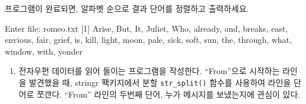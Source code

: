 \documentclass[
  letterpaper,
]{book}
\newenvironment{Shaded}{\begin{snugshade}}{\end{snugshade}}
\newcommand{\DecValTok}[1]{\textcolor[rgb]{0.68,0.00,0.00}{#1}}
\newcommand{\NormalTok}[1]{\textcolor[rgb]{0.00,0.23,0.31}{#1}}
\newcommand{\SpecialCharTok}[1]{\textcolor[rgb]{0.37,0.37,0.37}{#1}}
\newcommand{\StringTok}[1]{\textcolor[rgb]{0.13,0.47,0.30}{#1}}
\providecommand{\tightlist}{%
  \setlength{\itemsep}{0pt}\setlength{\parskip}{0pt}}\usepackage{longtable,booktabs,array}
\begin{document}
프로그램이 완료되면, 알파벳 순으로 결과 단어를 정렬하고 출력하세요.

\begin{Shaded}
\begin{Highlighting}[]
\NormalTok{Enter file}\SpecialCharTok{:}\NormalTok{ romeo.txt}
\NormalTok{[}\DecValTok{1}\NormalTok{] }\StringTok{\textquotesingle{}Arise\textquotesingle{}}\NormalTok{, }\StringTok{\textquotesingle{}But\textquotesingle{}}\NormalTok{, }\StringTok{\textquotesingle{}It\textquotesingle{}}\NormalTok{, }\StringTok{\textquotesingle{}Juliet\textquotesingle{}}\NormalTok{, }\StringTok{\textquotesingle{}Who\textquotesingle{}}\NormalTok{, }\StringTok{\textquotesingle{}already\textquotesingle{}}\NormalTok{,}
\StringTok{\textquotesingle{}and\textquotesingle{}}\NormalTok{, }\StringTok{\textquotesingle{}breaks\textquotesingle{}}\NormalTok{, }\StringTok{\textquotesingle{}east\textquotesingle{}}\NormalTok{, }\StringTok{\textquotesingle{}envious\textquotesingle{}}\NormalTok{, }\StringTok{\textquotesingle{}fair\textquotesingle{}}\NormalTok{, }\StringTok{\textquotesingle{}grief\textquotesingle{}}\NormalTok{,}
\StringTok{\textquotesingle{}is\textquotesingle{}}\NormalTok{, }\StringTok{\textquotesingle{}kill\textquotesingle{}}\NormalTok{, }\StringTok{\textquotesingle{}light\textquotesingle{}}\NormalTok{, }\StringTok{\textquotesingle{}moon\textquotesingle{}}\NormalTok{, }\StringTok{\textquotesingle{}pale\textquotesingle{}}\NormalTok{, }\StringTok{\textquotesingle{}sick\textquotesingle{}}\NormalTok{, }\StringTok{\textquotesingle{}soft\textquotesingle{}}\NormalTok{,}
\StringTok{\textquotesingle{}sun\textquotesingle{}}\NormalTok{, }\StringTok{\textquotesingle{}the\textquotesingle{}}\NormalTok{, }\StringTok{\textquotesingle{}through\textquotesingle{}}\NormalTok{, }\StringTok{\textquotesingle{}what\textquotesingle{}}\NormalTok{, }\StringTok{\textquotesingle{}window\textquotesingle{}}\NormalTok{,}
\StringTok{\textquotesingle{}with\textquotesingle{}}\NormalTok{, }\StringTok{\textquotesingle{}yonder\textquotesingle{}}
\end{Highlighting}
\end{Shaded}

\begin{enumerate}
\def\labelenumi{\arabic{enumi}.}
\setcounter{enumi}{1}
\tightlist
\item
  전자우편 데이터를 읽어 들이는 프로그램을 작성한다. ``From''으로
  시작하는 라인을 발견했을 때, stringr 팩키지에서 분할
  \texttt{str\_split()} 함수를 사용하여 라인을 단어로 쪼갠다. ``From''
  라인의 두번째 단어, 누가 메시지를 보냈는지에 관심이 있다.
\end{enumerate}
\end{document}
